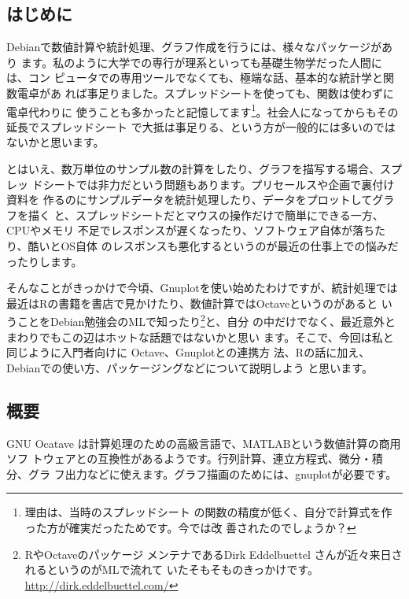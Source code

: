 \documentclass[mingoth,a4paper]{jsarticle}
\begin{document}

\subsection{はじめに}

Debianで数値計算や統計処理、グラフ作成を行うには、様々なパッケージがあり
ます。私のように大学での専行が理系といっても基礎生物学だった人間には、コン
ピュータでの専用ツールでなくても、極端な話、基本的な統計学と関数電卓があ
れば事足りました。スプレッドシートを使っても、関数は使わずに電卓代わりに
使うことも多かったと記憶してます\footnote{理由は、当時のスプレッドシート
の関数の精度が低く、自分で計算式を作った方が確実だったためです。今では改
善されたのでしょうか？}。社会人になってからもその延長でスプレッドシート
で大抵は事足りる、という方が一般的には多いのではないかと思います。

とはいえ、数万単位のサンプル数の計算をしたり、グラフを描写する場合、スプレッ
ドシートでは非力だという問題もあります。プリセールスや企画で裏付け資料を
作るのにサンプルデータを統計処理したり、データをプロットしてグラフを描く
と、スプレッドシートだとマウスの操作だけで簡単にできる一方、CPUやメモリ
不足でレスポンスが遅くなったり、ソフトウェア自体が落ちたり、酷いとOS自体
のレスポンスも悪化するというのが最近の仕事上での悩みだったりします。

そんなことがきっかけで今頃、Gnuplotを使い始めたわけですが、統計処理では
最近はRの書籍を書店で見かけたり、数値計算ではOctaveというのがあると
いうことをDebian勉強会のMLで知ったり\footnote{RやOctaveのパッケージ
メンテナであるDirk Eddelbuettel さんが近々来日されるというのがMLで流れて
いたそもそものきっかけです。\url{http://dirk.eddelbuettel.com/}}と、自分
の中だけでなく、最近意外とまわりでもこの辺はホットな話題ではないかと思い
ます。そこで、今回は私と同じように入門者向けに Octave、Gnuplotとの連携方
法、Rの話に加え、Debianでの使い方、パッケージングなどについて説明しよう
と思います。


\subsection{概要}
GNU Ocatave は計算処理のための高級言語で、MATLABという数値計算の商用ソフ
トウェアとの互換性があるようです。行列計算、連立方程式、微分・積分、グラ
フ出力などに使えます。グラフ描画のためには、gnuplotが必要です。
\end{document}

